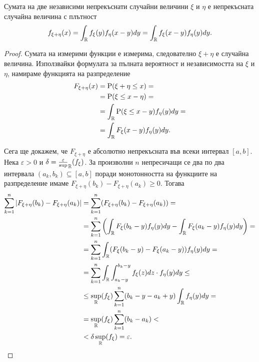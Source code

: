 \documentclass[numbers=endperiod, bibliography=totocnumbered]{scrartcl}
\begin{document}
\begin{proposition}\label{thm:density_of_sum_is_convolution}
  Сумата на две независими непрекъснати случайни величини \( \xi \) и \( \eta \) е непрекъсната случайна величина с плътност
  \begin{align*}
    f_{\xi + \eta} (x)
    =
    \int_{\mathbb{R}} f_\xi(y) f_\eta(x - y) dy
    =
    \int_{\mathbb{R}} f_\xi(x - y) f_\eta(y) dy.
  \end{align*}
\end{proposition}
\begin{proof} Сумата на измерими функции е измерима, следователно \( \xi + \eta \) е случайна величина. Използвайки формулата за пълната вероятност и независимостта на \( \xi \) и \( \eta \), намираме функцията на разпределение
  \begin{align*}
    F_{\xi + \eta} (x)
    &=
    \operatorname{P}(\xi + \eta \leq x)
    = \\ &=
    \operatorname{P}(\xi \leq x - \eta)
    = \\ &=
    \int_{\mathbb{R}} \operatorname{P}(\xi \leq x - y) f_\eta(y) dy
    = \\ &=
    \int_{\mathbb{R}} F_\xi(x - y) f_\eta(y) dy.
  \end{align*}

  Сега ще докажем, че \( F_{\xi + \eta} \) е абсолютно непрекъсната във всеки интервал \( [a, b] \). Нека \( \varepsilon > 0 \) и \( \delta = \frac \varepsilon \sup_{\mathbb{R}}(f_\xi) \). За произволни \( n \) непресичащи се два по два интервала \( (a_k, b_k) \subseteq [a, b] \) поради монотонността на функциите на разпределение имаме \( F_{\xi+\eta} (b_k) - F_{\xi+\eta}(a_k) \geq 0 \). Тогава
  \begin{align*}
    \sum_{k=1}^n \left\vert F_{\xi+\eta} (b_k) - F_{\xi+\eta}(a_k) \right\vert
    &=
    \sum_{k=1}^n (F_{\xi+\eta} (b_k) - F_{\xi+\eta}(a_k))
    = \\ &=
    \sum_{k=1}^n \left(\int_{\mathbb{R}} F_\xi(b_k - y) f_\eta(y) dy - \int_{\mathbb{R}} F_\xi(a_k - y) f_\eta(y) dy \right)
    = \\ &=
    \sum_{k=1}^n \int_{\mathbb{R}} (F_\xi(b_k - y) - F_\xi(a_k - y)) f_\eta(y) dy
    = \\ &=
    \sum_{k=1}^n \int_{\mathbb{R}} \int_{a_k - y}^{b_k - y} f_\xi(z) dz \cdot f_\eta(y) dy
    \leq \\ &\leq
    \sup_{\mathbb{R}}(f_\xi) \sum_{k=1}^n (b_k - y - a_k + y) \int_{\mathbb{R}} f_\eta(y) dy
    = \\ &=
    \sup_{\mathbb{R}}(f_\xi) \sum_{k=1}^n (b_k - a_k)
    < \\ &<
    \delta \sup_{\mathbb{R}}(f_\xi)
    =
    \varepsilon.
  \end{align*}


\end{proof}
\end{document}
